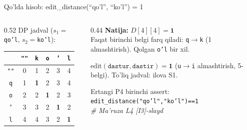 \documentclass[aspectratio=169,11pt]{beamer}
\begin{document}
%
\begin{frame}{Qo'lda hisob: edit\_distance(``qo'l'', ``ko'l'') = 1}
  \begin{columns}[T]
    \begin{column}{0.52\textwidth}
      \small DP jadval ($s_1=$\texttt{qo'l}, $s_2=$\texttt{ko'l}):
      \vspace{2pt}
      \begin{center}\footnotesize
      \begin{tabular}{c|ccccc}
         & \texttt{""} & \texttt{k} & \texttt{o} & \texttt{'} & \texttt{l} \\
        \hline
        \texttt{""} & 0 & 1 & 2 & 3 & 4 \\
        \texttt{q}  & 1 & \textbf{1} & 2 & 3 & 4 \\
        \texttt{o}  & 2 & 2 & \textbf{1} & 2 & 3 \\
        \texttt{'}  & 3 & 3 & 2 & \textbf{1} & 2 \\
        \texttt{l}  & 4 & 4 & 3 & 2 & \textbf{1} \\
      \end{tabular}
      \end{center}
    \end{column}
    \begin{column}{0.44\textwidth}
      \textbf{Natija:} $D[4][4] = \mathbf{1}$\\[3pt]
      \footnotesize
      Faqat birinchi belgi farq qiladi: \texttt{q}$\to$\texttt{k}
      (1 almashtirish). Qolgan \texttt{o'l} bir xil.
      \vspace{5pt}
      \begin{tcolorbox}[okbox,title=Ikkinchi tekshiruv,top=2pt,bottom=2pt]
        \footnotesize
        $\text{edit}(\texttt{dastur},\texttt{dastir}) = \mathbf{1}$
        (\texttt{u}$\to$\texttt{i} almashtirish, 5-belgi). To'liq jadval: ilova S1.
      \end{tcolorbox}
      \vspace{2pt}
      \footnotesize\color{halfgray}
      Ertangi P4 birinchi assert:\\
      \texttt{edit\_distance("qo'l","ko'l")==1}\\
      \textit{\# Ma'ruza L4 [I3]-slayd}
    \end{column}
  \end{columns}
\end{frame}
\end{document}
